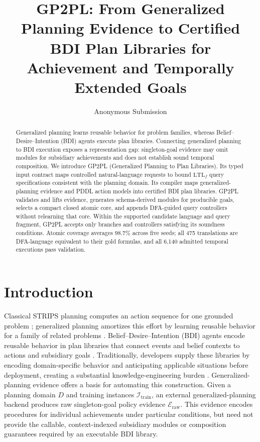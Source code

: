 \documentclass[letterpaper]{article}
\title{GP2PL: From Generalized Planning Evidence to Certified BDI Plan
Libraries for Achievement and Temporally Extended Goals}
\author{Anonymous Submission}
\newcommand{\ltlf}{\ensuremath{\mathrm{LTL}_f}}
\newcommand{\methodname}{GP2PL}
\begin{document}
\maketitle

\begin{abstract}
Generalized planning learns reusable behavior for problem families, whereas
Belief--Desire--Intention (BDI) agents execute plan libraries. Connecting
generalized planning to BDI execution exposes a representation gap:
singleton-goal evidence may omit modules for subsidiary achievements and does
not establish sound temporal composition. We
introduce
\methodname{} (Generalized Planning to Plan Libraries). Its typed input
contract maps controlled natural-language requests to bound
\ltlf{} query specifications consistent with the planning domain. Its compiler
maps generalized-planning evidence and
PDDL action models into certified BDI plan libraries. GP2PL validates and lifts
evidence, generates schema-derived modules for producible goals, selects a
compact closed atomic core, and appends DFA-guided query controllers without
relearning that core. Within the supported candidate language and query fragment,
GP2PL accepts only branches and controllers satisfying its soundness conditions.
Atomic coverage averages 98.7\% across five seeds; all 475 translations are
DFA-language equivalent to their gold formulas, and all 6,140 admitted temporal
executions pass validation.
\end{abstract}

\section{Introduction}

Classical STRIPS planning computes an action sequence for one grounded problem
\cite{FikesNilsson1971STRIPS}; generalized planning amortizes this effort by learning
reusable behavior for a family of related problems
\cite{Srivastava2011DirectedSearch,Chen2026Moose}. Belief--Desire--Intention
(BDI) agents encode reusable behavior in plan libraries that connect events and
belief contexts to actions and subsidiary goals
\cite{Rao1996AgentSpeak,MeneguzziDeSilva2015PlanningBDI}. Traditionally,
developers supply these libraries by encoding domain-specific behavior and
anticipating applicable situations before deployment, creating a substantial
knowledge-engineering burden
\cite{Meneguzzi2004PropositionalPlanning,MeneguzziDeSilva2015PlanningBDI}.
Generalized-planning evidence offers a basis for automating this construction.
Given a planning domain $D$ and training instances
$\mathcal I_{\mathrm{train}}$, an external generalized-planning backend produces
raw singleton-goal policy evidence $\mathcal E_{\mathrm{raw}}$. This evidence
encodes procedures for individual achievements under particular conditions,
but need not provide the callable, context-indexed subsidiary modules or
composition guarantees required by an executable BDI library.
\end{document}
